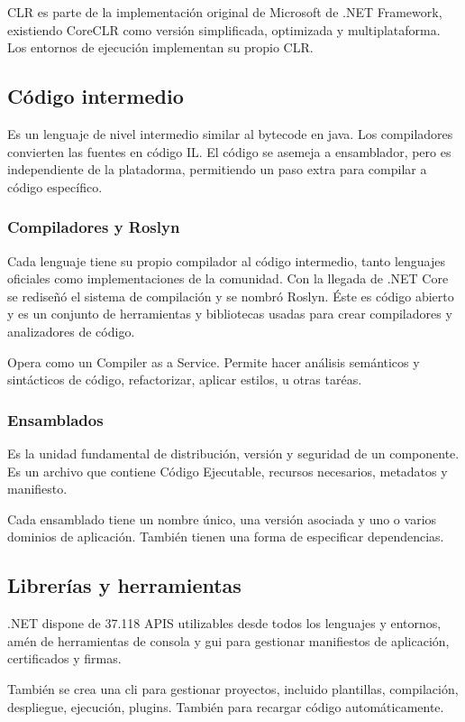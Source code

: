         CLR es parte de la implementación original de Microsoft de .NET Framework, existiendo CoreCLR como  versión simplificada, optimizada y multiplataforma. Los entornos de ejecución implementan su propio CLR.

    \subsection{Código intermedio}
        Es un lenguaje de nivel intermedio similar al bytecode en java. Los compiladores convierten las fuentes en código IL. El código se asemeja a ensamblador, pero es independiente de la platadorma, permitiendo un paso extra para compilar a código específico.

    \subsubsection{Compiladores y Roslyn}
        Cada lenguaje tiene su propio compilador al código intermedio, tanto lenguajes oficiales como implementaciones de la comunidad. Con la llegada de .NET Core se rediseñó el sistema de compilación y se nombró Roslyn. Éste es código abierto y es un conjunto de herramientas y bibliotecas usadas para crear compiladores y analizadores de código.

        Opera como un Compiler as a Service. Permite hacer análisis semánticos y sintácticos de código, refactorizar, aplicar estilos, u otras taréas.

    \subsubsection{Ensamblados}
        Es la unidad fundamental de distribución, versión y seguridad de un componente. Es un archivo que contiene Código Ejecutable, recursos necesarios, metadatos y manifiesto.

        Cada ensamblado tiene un nombre único, una versión asociada y uno o varios dominios de aplicación. También tienen una forma de especificar dependencias.

\subsection{Librerías y herramientas}
    .NET dispone de 37.118 APIS utilizables desde todos los lenguajes y entornos, amén de herramientas de consola y gui para gestionar manifiestos de aplicación, certificados y firmas.

    También se crea una cli para gestionar proyectos, incluido plantillas, compilación, despliegue, ejecución, plugins. También para recargar código automáticamente.

